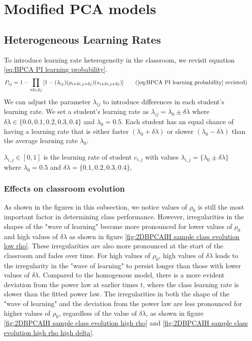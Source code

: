 \chapter{Modified PCA models}

\section{Heterogeneous Learning Rates}
To introduce learning rate heterogeneity in the classroom, we revisit equation \ref{eq:BPCA PI learning probability}. 
\begin{equation*}
    P_{ij} = 1 - \prod_{\forall \delta i, \delta j}{\lbrack1-(\lambda_{ij})(\rho_{i+\delta i, j+\delta j})(s_{i+\delta i, j+\delta j})}\rbrack
    \tag{\ref{eq:BPCA PI learning probability} revisted}
\end{equation*}
We can adjust the parameter $\lambda_{ij}$ to introduce differences in each student's learning rate. 
We set a student's learning rate as $\lambda_{ij} = \lambda_0 \pm \delta\lambda$ where $\delta\lambda \in \lbrace 0.0,0.1, 0.2, 0.3, 0.4\rbrace$ and $\lambda_0 = 0.5$. 
Each student has an equal chance of having a learning rate that is either faster $(\lambda_0 + \delta\lambda)$ or slower $(\lambda_0 - \delta\lambda)$ than the average learning rate $\lambda_0$. 

$\lambda_{i,j} \in [0,1]$ is the learning rate of student $c_{i,j}$ with values $\lambda_{i,j} = \lbrace \lambda_0 \pm \delta \lambda \rbrace$ where $\lambda_0 = 0.5$ and $\delta \lambda = \lbrace 0.1, 0.2, 0.3, 0.4 \rbrace$, 

\subsection{Effects on classroom evolution}\label{subsec:BPCAIH effects on classroom evolution}
As shown in the figures in this subsection, we notice values of $\rho_0$ is still the most important factor in determining class performance. 
However, irregularities in the shapes of the "wave of learning" become more pronounced for lower values of $\rho_0$ and high values of $\delta\lambda$ as shown in figure \ref{fig:2DBPCAIH sample class evolution low rho}.
These irregularities are also more pronounced at the start of the classroom and fades over time.
For high values of $\rho_0$, high values of $\delta\lambda$ leads to the irregularity in the "wave of learning" to persist longer than those with lower values of $\delta\lambda$.
Compared to the homogenous model, there is a more evident deviation from the power law at earlier times $t$, where the class learning rate is slower than the fitted power law.
The irregularities in both the shape of the "wave of learning" and the deviation from the power law are less pronounced for higher values of $\rho_0$, regardless of the value of $\delta\lambda$, as shown in figure \ref{fig:2DBPCAIH sample class evolution high rho} and \ref{fig:2DBPCAIH sample class evolution high rho high delta}.

